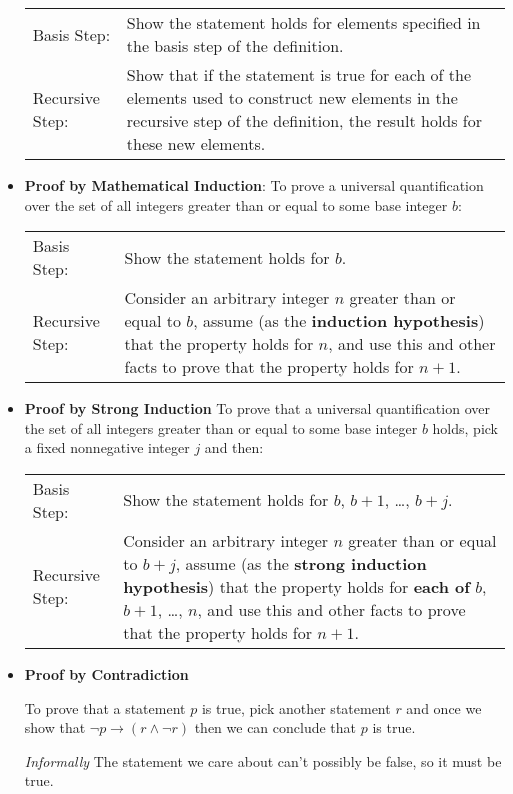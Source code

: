 \documentclass[12pt, oneside]{article}
\begin{document}
\begin{itemize}
        \begin{tabularx}{\textwidth}{l X}
        Basis Step: & Show the statement holds for elements specified in the basis step of the definition. \\
        Recursive Step: & Show that if the statement is true for each of the elements used to construct
    new elements in the recursive step of the definition, the result holds for these new elements.
    \end{tabularx}
    
    \item {\bf Proof by Mathematical Induction}: To prove a universal quantification over the set of  all integers greater than  or  equal to some base integer $b$:
    
    \begin{tabularx}{\textwidth}{l X}
        Basis Step: & Show the statement holds for $b$. \\
        Recursive Step: & Consider an arbitrary integer $n$ greater than or  equal to  $b$, assume
        (as the {\bf induction hypothesis})  that the property holds  for $n$, and use  this and
        other facts to  prove that  the property holds for $n+1$.
    \end{tabularx}
    
    \item {\bf Proof by Strong Induction} To prove that a universal quantification over the set of all integers greater than or equal to some  base integer $b$ holds,  pick a  fixed nonnegative integer  $j$ and then: \hfill 
    
    \begin{tabularx}{\textwidth}{l X}
        Basis Step: & Show the statement holds for $b$, $b+1$, \ldots, $b+j$. \\
        Recursive Step: & Consider an arbitrary integer $n$ greater than or  equal to  $b+j$, assume
        (as the {\bf strong  induction hypothesis})  that the property holds  for {\bf each of} $b$, $b+1$, \ldots, $n$, 	
        and use  this and
        other facts to  prove that  the property holds for $n+1$.
    \end{tabularx}

    \item {\bf Proof by Contradiction} 

    To prove that a statement $p$ is true, pick another statement $r$ and once we show
    that $\neg p  \to (r \wedge  \neg r)$ then  we can conclude that  $p$ is  true.
    
    {\it Informally} The statement we care about can't possibly be false, so it must be true.
\end{itemize}
\end{document}
